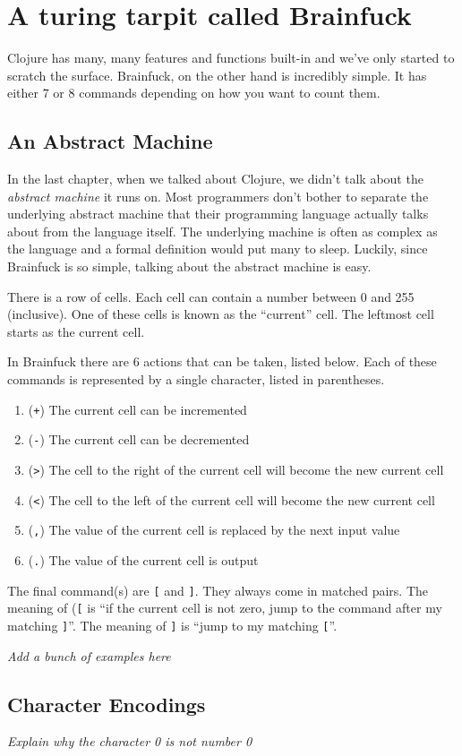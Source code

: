 \chapter{A turing tarpit called Brainfuck}

Clojure has many, many features and functions built-in and we've only
started to scratch the surface.  Brainfuck, on the other hand is
incredibly simple.  It has either 7 or 8 commands depending on how you
want to count them.

\section{An Abstract Machine}

In the last chapter, when we talked about Clojure, we didn't talk
about the {\em abstract machine} it runs on.  Most programmers don't
bother to separate the underlying abstract machine that their
programming language actually talks about from the language itself.
The underlying machine is often as complex as the language and a
formal definition would put many to sleep.  Luckily, since Brainfuck
is so simple, talking about the abstract machine is easy.

There is a row of cells. Each cell can contain a number between 0 and
255 (inclusive).  One of these cells is known as the ``current''
cell.  The leftmost cell starts as the current cell.

In Brainfuck there are 6 actions that can be taken, listed below. Each of these commands is represented by a single character, listed in parentheses.

\begin{enumerate}
\item ({\tt +}) The current cell can be incremented
\item ({\tt -}) The current cell can be decremented
\item ({\tt >}) The cell to the right of the current cell will become the new
  current cell
\item ({\tt <}) The cell to the left of the current cell will become the new
  current cell
\item ({\tt ,}) The value of the current cell is replaced by the next input value
\item ({\tt .}) The value of the current cell is output
\end{enumerate}

The final command(s) are {\tt [} and {\tt ]}.  They always come in
matched pairs.  The meaning of ({\tt [} is ``if the current cell is
not zero, jump to the command after my matching {\tt ]}''. The
meaning of {\tt ]} is ``jump to my matching {\tt [}''.

{\em Add a bunch of examples here}

\section{Character Encodings}

{\em Explain why the character 0 is not number 0}
